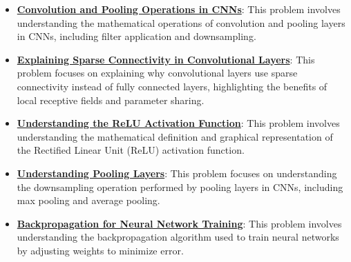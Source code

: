 \documentclass{article}%
\begin{document}
\begin{itemize}[leftmargin=*]
\item \href{https://purdue.brightspace.com/d2l/common/assets/pdfjs-d2l-dist/1.0.14-legacy/web/viewer.html?file=%2Fcontent%2Fenforced%2F1095467-wl.202510.CS.24300.001%2F09L1-cnn.pdf%3Fou%3D1095467&lang=en-us&container=d2l-fileviewer-rendered-pdf&fullscreen=d2l-fileviewer-rendered-pdf-dialog&height=667#page=6}{\textbf{Convolution and Pooling Operations in CNNs}}: This problem involves understanding the mathematical operations of convolution and pooling layers in CNNs, including filter application and downsampling.%
\item \href{https://purdue.brightspace.com/d2l/common/assets/pdfjs-d2l-dist/1.0.14-legacy/web/viewer.html?file=%2Fcontent%2Fenforced%2F1095467-wl.202510.CS.24300.001%2F09L1-cnn.pdf%3Fou%3D1095467&lang=en-us&container=d2l-fileviewer-rendered-pdf&fullscreen=d2l-fileviewer-rendered-pdf-dialog&height=667#page=10}{\textbf{Explaining Sparse Connectivity in Convolutional Layers}}: This problem focuses on explaining why convolutional layers use sparse connectivity instead of fully connected layers, highlighting the benefits of local receptive fields and parameter sharing.%
\item \href{https://purdue.brightspace.com/d2l/common/assets/pdfjs-d2l-dist/1.0.14-legacy/web/viewer.html?file=%2Fcontent%2Fenforced%2F1095467-wl.202510.CS.24300.001%2F09L1-cnn.pdf%3Fou%3D1095467&lang=en-us&container=d2l-fileviewer-rendered-pdf&fullscreen=d2l-fileviewer-rendered-pdf-dialog&height=667#page=13}{\textbf{Understanding the ReLU Activation Function}}: This problem involves understanding the mathematical definition and graphical representation of the Rectified Linear Unit (ReLU) activation function.%
\item \href{https://purdue.brightspace.com/d2l/common/assets/pdfjs-d2l-dist/1.0.14-legacy/web/viewer.html?file=%2Fcontent%2Fenforced%2F1095467-wl.202510.CS.24300.001%2F09L1-cnn.pdf%3Fou%3D1095467&lang=en-us&container=d2l-fileviewer-rendered-pdf&fullscreen=d2l-fileviewer-rendered-pdf-dialog&height=667#page=14}{\textbf{Understanding Pooling Layers}}: This problem focuses on understanding the downsampling operation performed by pooling layers in CNNs, including max pooling and average pooling.%
\item \href{https://purdue.brightspace.com/d2l/common/assets/pdfjs-d2l-dist/1.0.14-legacy/web/viewer.html?file=%2Fcontent%2Fenforced%2F1095467-wl.202510.CS.24300.001%2F09L1-cnn.pdf%3Fou%3D1095467&lang=en-us&container=d2l-fileviewer-rendered-pdf&fullscreen=d2l-fileviewer-rendered-pdf-dialog&height=667#page=16}{\textbf{Backpropagation for Neural Network Training}}: This problem involves understanding the backpropagation algorithm used to train neural networks by adjusting weights to minimize error.%

\end{itemize}
\end{document}
